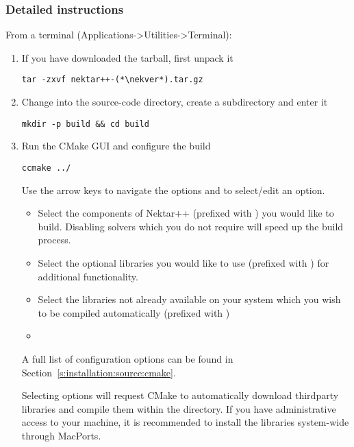 \subsubsection{Detailed instructions}
From a terminal (Applications->Utilities->Terminal):
\begin{enumerate}
    \item If you have downloaded the tarball, first unpack it
    \begin{lstlisting}[style=BashInputStyle]
tar -zxvf nektar++-(*\nekver*).tar.gz
    \end{lstlisting}

    \item Change into the source-code directory, create a 
    subdirectory and enter it
    \begin{lstlisting}[style=BashInputStyle]
    mkdir -p build && cd build
    \end{lstlisting}

    \item Run the CMake GUI and configure the build
    \begin{lstlisting}[style=BashInputStyle]
    ccmake ../
    \end{lstlisting}
    Use the arrow keys to navigate the options and  to select/edit
    an option.
    \begin{itemize}
        \item Select the components of Nektar++ (prefixed with
        ) you would like to build. Disabling solvers
        which you do not require will speed up the build process.
        \item Select the optional libraries you would like to use (prefixed with
        ) for additional functionality.
        \item Select the libraries not already available on your system which
        you wish to be compiled automatically (prefixed with
        )
        \item
    \end{itemize}
    A full list of configuration options can be found in
    Section~\ref{s:installation:source:cmake}.

    \begin{notebox}
    Selecting  options will request CMake to
    automatically download thirdparty libraries and compile them within the
    \nekpp directory. If you have administrative access to your machine, it is
    recommended to install the libraries system-wide through MacPorts.
    \end{notebox}


\end{enumerate}
